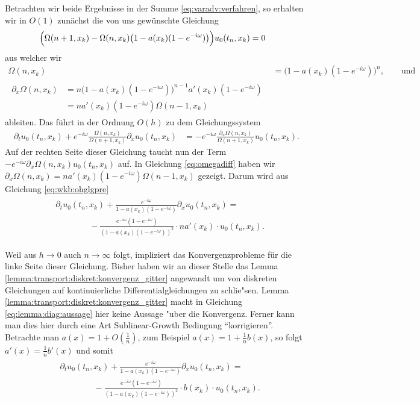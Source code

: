 Betrachten wir beide Ergebnisse in der Summe \eqref{eq:varadv:verfahren}, so erhalten wir in $O(1)$ zunächst die von uns gewünschte Gleichung
\begin{align}
\Bigl( \Omega(n+1, x_k)  - \Omega(n,x_k) \bigl(1 - a(x_k) (1-e^{-i\omega}) \bigr) \Bigr) u_0(t_n, x_k) &= 0
\end{align}
aus welcher wir
\begin{align}
\Omega(n,x_k) &= \bigl(1 - a(x_k) (1-e^{-i\omega}) \bigr)^n, \qquad \text{und}\\
\begin{split}\label{eq:omegadiff}
\partial_x \Omega(n,x_k) &= n \bigl(1 - a(x_k) (1-e^{-i\omega}) \bigr)^{n-1} a'(x_k) (1-e^{-i\omega})\\
&= n a'(x_k) (1-e^{-i\omega}) \Omega(n-1, x_k)
\end{split}
\end{align}
ableiten.
Das führt in der Ordnung $O(h)$ zu dem Gleichungssystem
\begin{align}\label{eq:wkb:ohglgpre}
\partial_t u_0(t_n, x_k) + e^{-i \omega} \frac{\Omega(n,x_k)}{\Omega(n+1, x_k)} \partial_x u_0(t_n, x_k) &= - e^{-i \omega} \frac{\partial_x \Omega(n,x_k)}{\Omega(n+1, x_k)} u_0(t_n, x_k).
\end{align}
Auf der rechten Seite dieser Gleichung taucht nun der Term $- e^{-i \omega} \partial_x \Omega(n,x_k) u_0(t_n, x_k)$ auf.
In Gleichung \eqref{eq:omegadiff} haben wir $\partial_x \Omega(n,x_k) = n a'(x_k) (1-e^{-i\omega}) \Omega(n-1, x_k)$ gezeigt.
Darum wird aus Gleichung \eqref{eq:wkb:ohglgpre} 
\begin{align}\label{eq:wkb:ohpost}
\begin{split}
&\partial_t u_0(t_n, x_k) + \frac{e^{-i \omega}}{1 - a(x_k) (1-e^{-i\omega})} \partial_x u_0(t_n, x_k) =\\
&\qquad \qquad - \frac{e^{-i \omega} (1 - e^{-i\omega})}{(1 - a(x_k) (1-e^{-i\omega}))^2} \cdot n a'(x_k) \cdot u_0(t_n, x_k).
\end{split}
\end{align}

Weil aus $h \to 0$ auch $n \to \infty$ folgt, impliziert das Konvergenzprobleme für die linke Seite dieser Gleichung.
Bisher haben wir an dieser Stelle das Lemma \ref{lemma:transport:diskret:konvergenz_gitter} angewandt um von diskreten Gleichungen auf kontinuierliche Differentialgleichungen zu schlie"sen.
Lemma \ref{lemma:transport:diskret:konvergenz_gitter} macht in Gleichung \eqref{eq:lemma:diag:aussage} hier keine Aussage "uber die Konvergenz.
Ferner kann man dies hier durch eine Art Sublinear-Growth Bedingung ``korrigieren''.
Betrachte man $a(x) = 1 + O\left(\frac{1}{n} \right)$, zum Beispiel $a(x) = 1 + \frac{1}{n} b(x)$, so folgt $a'(x) = \frac{1}{n} b'(x)$ und somit
\begin{align}\label{eq:wkb:ohpost2}
\begin{split}
&\partial_t u_0(t_n, x_k) + \frac{e^{-i \omega}}{1 - a(x_k) (1-e^{-i\omega})} \partial_x u_0(t_n, x_k) =\\
&\qquad \qquad - \frac{e^{-i \omega} (1 - e^{-i\omega})}{(1 - a(x_k) (1-e^{-i\omega}))^2} \cdot b(x_k) \cdot u_0(t_n, x_k).
\end{split}
\end{align}

